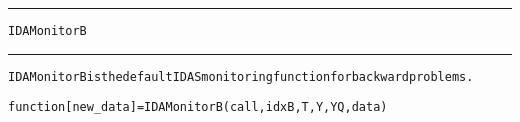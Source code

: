 \begin{samepage}
\hrule
\begin{center}
{\large \verb!IDAMonitorB!}
\label{p:IDAMonitorB}
\end{center}
\hrule\vspace{0.1in}



\begin{alltt}
IDAMonitorB is the default IDAS monitoring function for backward problems.
\end{alltt}

\end{samepage}



\begin{samepage}


\begin{alltt}
function [new_data] = IDAMonitorB(call, idxB, T, Y, YQ, data) 
\end{alltt}

\end{samepage}



